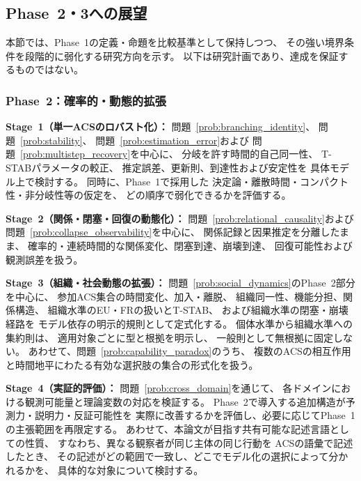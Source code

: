 \subsection{Phase~2・3への展望}
\label{subsec:phase_outlook}

本節では、Phase~1の定義・命題を比較基準として保持しつつ、
その強い境界条件を段階的に弱化する研究方向を示す。
以下は研究計画であり、達成を保証するものではない。

\subsubsection*{Phase~2：確率的・動態的拡張}
\label{subsubsec:phase2}

\noindent\textbf{Stage~1（単一ACSのロバスト化）：}
問題~\ref{prob:branching_identity}、
問題~\ref{prob:stability}、
問題~\ref{prob:estimation_error}および
問題~\ref{prob:multistep_recovery}を中心に、
分岐を許す時間的自己同一性、
T-STABパラメータの較正、
推定誤差、更新則、到達性および安定性を
具体モデル上で検討する。
同時に、Phase~1で採用した
決定論・離散時間・コンパクト性・非分岐性等の仮定を、
どの順序で弱化できるかを評価する。

\medskip
\noindent\textbf{Stage~2（関係・閉塞・回復の動態化）：}
問題~\ref{prob:relational_causality}および
問題~\ref{prob:collapse_observability}を中心に、
関係記録と因果推定を分離したまま、
確率的・連続時間的な関係変化、閉塞到達、崩壊到達、
回復可能性および観測誤差を扱う。

\medskip
\noindent\textbf{Stage~3（組織・社会動態の拡張）：}
問題~\ref{prob:social_dynamics}のPhase~2部分を中心に、
参加ACS集合の時間変化、加入・離脱、
組織同一性、機能分担、関係構造、
組織水準のEU・FRの扱いとT-STAB、
および組織水準の閉塞・崩壊経路を
モデル依存の明示的規則として定式化する。
個体水準から組織水準への集約則は、
適用対象ごとに型と根拠を明示し、
一般則として無根拠に固定しない。
あわせて、問題~\ref{prob:capability_paradox}のうち、
複数のACSの相互作用と時間地平にわたる有効な選択肢の集合の形式化を扱う。

\medskip
\noindent\textbf{Stage~4（実証的評価）：}
問題~\ref{prob:cross_domain}を通じて、
各ドメインにおける観測可能量と理論変数の対応を検証する。
Phase~2で導入する追加構造が予測力・説明力・反証可能性を
実際に改善するかを評価し、必要に応じてPhase~1の主張範囲を再限定する。
あわせて、本論文が目指す共有可能な記述言語としての性質、
すなわち、異なる観察者が同じ主体の同じ行動を
ACSの語彙で記述したとき、
その記述がどの範囲で一致し、どこでモデル化の選択によって分かれるかを、
具体的な対象について検討する。

